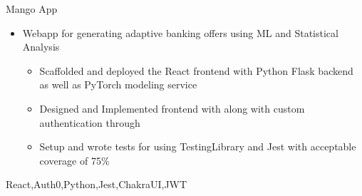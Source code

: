 %
%
%


\begin{projects}
	\project
	{Mango App}{ }
	{}
	{\begin{itemize}
        \setlength\itemsep{0.2em}
        \item{Webapp for generating adaptive banking offers using ML and Statistical Analysis}
        \begin{itemize}
            \setlength\itemsep{0.2em}
            \item{Scaffolded and deployed the React frontend with Python Flask backend as well as PyTorch modeling service}
            \item{Designed and Implemented frontend with  along with custom authentication through }
            \item{Setup and wrote tests for using TestingLibrary and Jest with acceptable coverage of 75\%}
        \end{itemize}   
      \end{itemize}
    }
	{React,Auth0,Python,Jest,ChakraUI,JWT}
\end{projects}
